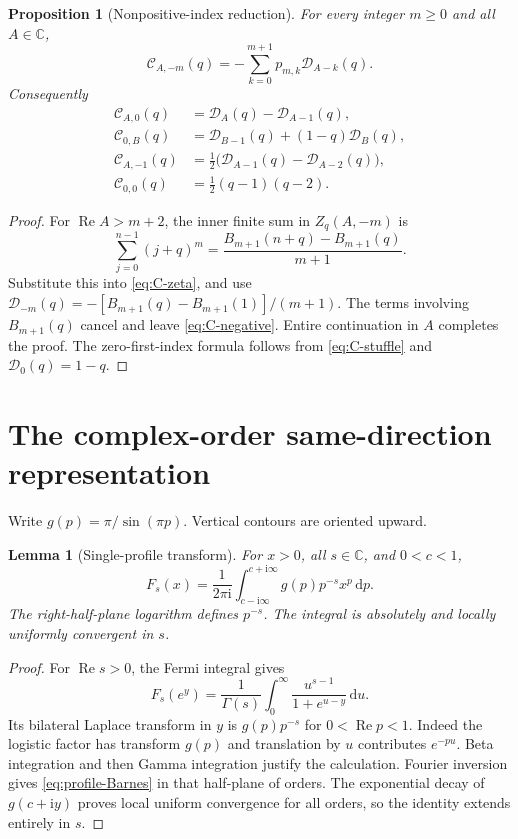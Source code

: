 \documentclass[11pt]{article}
\numberwithin{equation}{section}
\newtheorem{lemma}[theorem]{Lemma}
\newtheorem{proposition}[theorem]{Proposition}
\theoremstyle{definition}
\DeclareMathOperator{\Rea}{Re}
\newcommand{\C}{\mathbb C}
\newcommand{\dd}{\,\mathrm d}
\newcommand{\ii}{\mathrm i}
\newcommand{\CC}{\mathcal C}
\newcommand{\DD}{\mathcal D}
\begin{document}
\begin{proposition}[Nonpositive-index reduction]\label{prop:C-negative}
For every integer $m\ge0$ and all $A\in\C$,
\begin{equation}\label{eq:C-negative}
 \CC_{A,-m}(q)=-\sum_{k=0}^{m+1}p_{m,k}\DD_{A-k}(q).
\end{equation}
Consequently
\begin{align}
 \CC_{A,0}(q)&=\DD_A(q)-\DD_{A-1}(q),\label{eq:C-A0}\\
 \CC_{0,B}(q)&=\DD_{B-1}(q)+(1-q)\DD_B(q),\label{eq:C-0B}\\
 \CC_{A,-1}(q)&=\tfrac12\bigl(\DD_{A-1}(q)-\DD_{A-2}(q)\bigr),\label{eq:C-Am1}\\
 \CC_{0,0}(q)&=\tfrac12(q-1)(q-2).
\end{align}
\end{proposition}
\begin{proof}
For $\Rea A>m+2$, the inner finite sum in $Z_q(A,-m)$ is
\[
 \sum_{j=0}^{n-1}(j+q)^m
 =\frac{B_{m+1}(n+q)-B_{m+1}(q)}{m+1}.
\]
Substitute this into \eqref{eq:C-zeta}, and use
$\DD_{-m}(q)=-[B_{m+1}(q)-B_{m+1}(1)]/(m+1)$. The terms involving $B_{m+1}(q)$ cancel and leave \eqref{eq:C-negative}. Entire continuation in $A$ completes the proof. The zero-first-index formula follows from \eqref{eq:C-stuffle} and $\DD_0(q)=1-q$.
\end{proof}

\section{The complex-order same-direction representation}\label{sec:Barnes}
Write $g(p)=\pi/\sin(\pi p)$. Vertical contours are oriented upward.

\begin{lemma}[Single-profile transform]\label{lem:profile}
For $x>0$, all $s\in\C$, and $0<c<1$,
\begin{equation}\label{eq:profile-Barnes}
 F_s(x)=\frac1{2\pi\ii}\int_{c-\ii\infty}^{c+\ii\infty}
 g(p)p^{-s}x^p\dd p.
\end{equation}
The right-half-plane logarithm defines $p^{-s}$. The integral is absolutely and locally uniformly convergent in $s$.
\end{lemma}
\begin{proof}
For $\Rea s>0$, the Fermi integral gives
\[
 F_s(e^y)=\frac1{\Gamma(s)}\int_0^\infty
 \frac{u^{s-1}}{1+e^{u-y}}\dd u.
\]
Its bilateral Laplace transform in $y$ is $g(p)p^{-s}$ for $0<\Rea p<1$. Indeed the logistic factor has transform $g(p)$ and translation by $u$ contributes $e^{-pu}$. Beta integration and then Gamma integration justify the calculation. Fourier inversion gives \eqref{eq:profile-Barnes} in that half-plane of orders. The exponential decay of $g(c+\ii y)$ proves local uniform convergence for all orders, so the identity extends entirely in $s$.
\end{proof}
\end{document}
